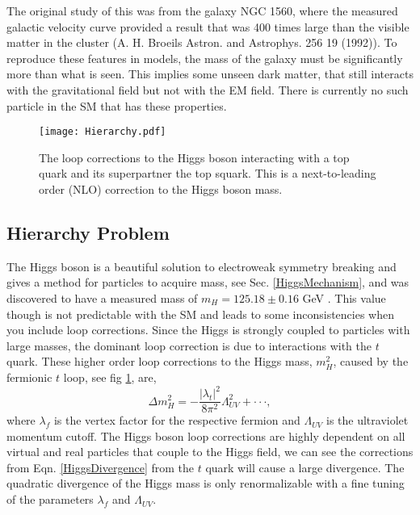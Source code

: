 The original study of this was from the galaxy NGC 1560, where the measured galactic velocity curve provided a result that was 400 times large than the visible matter in the cluster (A. H. Broeils Astron. and Astrophys. 256 19 (1992)).  To reproduce these features in models, the mass of the galaxy must be significantly more than what is seen. This implies some unseen dark matter, that still interacts with the gravitational field but not with the EM field. There is currently no such particle in the SM that has these properties.

\begin{figure}
 	\centering
	\texttt{[image: Hierarchy.pdf]}
 	\caption[Hierarchy Problem Loop Correction]{The loop corrections to the Higgs boson interacting with a top quark and its superpartner the top squark. This is a next-to-leading order (NLO) correction to the Higgs boson mass.}
 	\label{HiggsMass} 
\end{figure}

\subsection{Hierarchy Problem} 
The Higgs boson is a beautiful solution to electroweak symmetry breaking and gives a method for particles to acquire mass, see Sec. \ref{HiggsMechanism},  and was discovered to have a measured mass of $m_{H}=125.18\pm0.16$ GeV \cite{chatrchyan_observation_2012}. This value though is not predictable with the SM and leads to some inconsistencies when you include loop corrections. Since the Higgs is strongly coupled to particles with large masses, the dominant loop correction is due to interactions with the $t$ quark. These higher order loop corrections to the Higgs mass, $m_H^2$, caused by the fermionic $t$ loop, see fig \ref{HiggsMass}, are,
\begin{equation} \label{HiggsDivergence}
\Delta m_{H}^{2}=-\frac{|\lambda_{t}|^{2}}{8\pi^{2}}\Lambda_{UV}^{2}+\cdot\cdot\cdot,
\end{equation}
where $\lambda_f$ is the vertex factor for the respective fermion and $\Lambda_{UV}$ is the ultraviolet momentum cutoff. The Higgs boson loop corrections are highly dependent on all virtual and real particles that couple to the Higgs field, we can see the corrections from Eqn. \ref{HiggsDivergence} from the $t$ quark will cause a large divergence. The quadratic divergence of the Higgs mass is only renormalizable with a fine tuning of the parameters $\lambda_f$ and $\Lambda_{UV}$. 

